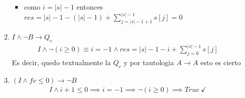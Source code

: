 \documentclass{article}
\begin{document}
\begin{itemize}
\begin{enumerate}
\begin{itemize}
            \item como $i=|s|-1$ entonces $res=|s|-1-(|s|-1)+\sum\limits_{j=|s|-1+1}^{|s|-1}s[j]=0$
        \end{itemize}
        \item $I\land\neg B\to Q_c$
        \cont\begin{align}
            I\land \neg(i\geq0)\equiv i=-1 \land res=|s|-1-i+\sum\limits_{j=0}^{|s|-1}s[j]
        \end{align}
        Es decir, quedo textualmente la $Q_c$ y por tautologia $A\to A$ esto es cierto
        \item $(I\land fv\leq0)\to\neg B$
        \cont\begin{align}
            I\land i+1\leq0\implies i=-1 \implies \neg(i\geq0)\implies True\ \checkmark
        \end{align}
    \end{enumerate}
\end{itemize}
\end{document}
